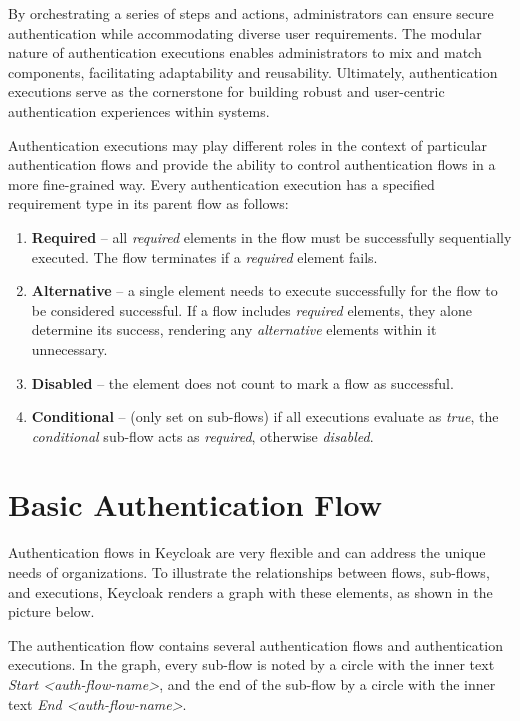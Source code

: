 By orchestrating a series of steps and actions, administrators can ensure secure authentication while accommodating diverse user requirements.
The modular nature of authentication executions enables administrators to mix and match components, facilitating adaptability and reusability.
Ultimately, authentication executions serve as the cornerstone for building robust and user-centric authentication experiences within systems.

Authentication executions may play different roles in the context of particular authentication flows and provide the ability to control authentication flows in a more fine-grained way. \cite{keycloak-auth-flows}
\newline
\newline
Every authentication execution has a specified requirement type in its parent flow as follows:

\begin{enumerate}
    \item \textbf{Required} -- all \textit{required} elements in the flow must be successfully sequentially executed. The flow terminates if a \textit{required} element fails.
    \item \textbf{Alternative} -- a single element needs to execute successfully for the flow to be considered successful. If a flow includes \textit{required} elements, they alone determine its success, rendering any \textit{alternative} elements within it unnecessary.
    \item \textbf{Disabled} -- the element does not count to mark a flow as successful.
    \item \textbf{Conditional} -- (only set on sub-flows) if all executions evaluate as \textit{true}, the \textit{conditional} sub-flow acts as \textit{required}, otherwise \textit{disabled}.
\end{enumerate}

\newpage

\section{Basic Authentication Flow}
Authentication flows in Keycloak are very flexible and can address the unique needs of organizations.
To illustrate the relationships between flows, sub-flows, and executions, Keycloak renders a graph with these elements, as shown in the picture below.

The authentication flow contains several authentication flows and authentication executions.
In the graph, every sub-flow is noted by a circle with the inner text \textit{Start <auth-flow-name>}, and the end of the sub-flow by a circle with the inner text \textit{End <auth-flow-name>}.

